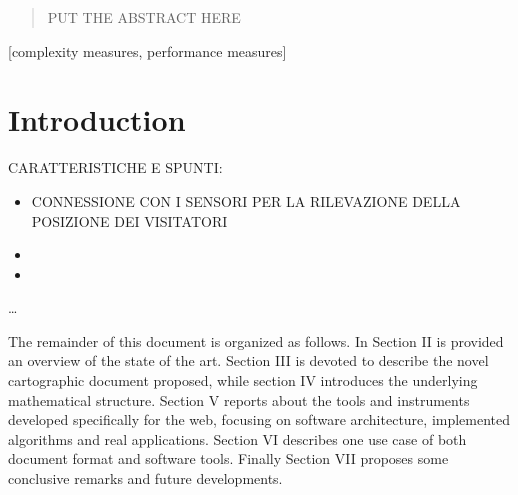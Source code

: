 \documentclass{sig-alternate}
\begin{document}
\date{30 July 1999}

\maketitle
\begin{abstract}
PUT THE ABSTRACT HERE
\end{abstract}

[complexity measures, performance measures]



\section{Introduction}\label{introduction}

CARATTERISTICHE E SPUNTI:

\begin{itemize}
\item
  CONNESSIONE CON I SENSORI PER LA RILEVAZIONE DELLA POSIZIONE DEI
  VISITATORI
\item
\item
\end{itemize}

\ldots{}

The remainder of this document is organized as follows. In Section II is
provided an overview of the state of the art. Section III is devoted to
describe the novel cartographic document proposed, while section IV
introduces the underlying mathematical structure. Section V reports
about the tools and instruments developed specifically for the web,
focusing on software architecture, implemented algorithms and real
applications. Section VI describes one use case of both document format
and software tools. Finally Section VII proposes some conclusive remarks
and future developments.
\end{document}
